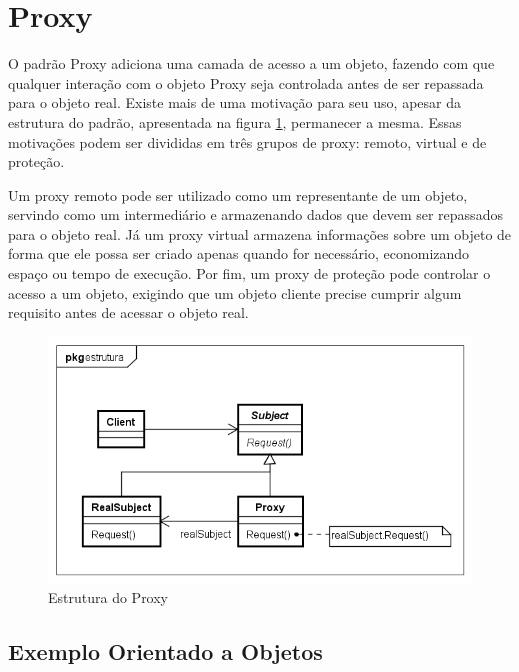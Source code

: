 \section{Proxy}

O padrão Proxy adiciona uma camada de acesso 
a um objeto, fazendo com que qualquer interação 
com o objeto Proxy seja controlada antes de ser 
repassada para o objeto real. Existe mais 
de uma motivação para seu uso, apesar 
da estrutura do padrão, 
apresentada na figura \ref{proxy_struct},  
permanecer a mesma. Essas motivações 
podem ser divididas em três grupos de 
proxy: remoto, virtual e de proteção. \cite{gamma:1995}

Um proxy remoto pode ser utilizado como um 
representante de um objeto, servindo como um 
intermediário e armazenando dados que devem 
ser repassados para o objeto real. Já um 
proxy virtual armazena informações sobre 
um objeto de forma que ele possa ser criado 
apenas quando for necessário, economizando 
espaço ou tempo de execução. Por fim, um 
proxy de proteção pode controlar o acesso 
a um objeto, exigindo que um objeto cliente 
precise cumprir algum requisito antes de 
acessar o objeto real. \cite{gamma:1995}

\begin{figure}[htb]
	\caption{\label{proxy_struct}Estrutura do Proxy}
	\begin{center}
	    \includegraphics[scale=0.5]{5_padroes-contexto-funcional/5.2_estruturais/5.2.7_proxy/proxy_estrutura.png}
	\end{center}
\end{figure}

\subsection*{Exemplo Orientado a Objetos}

